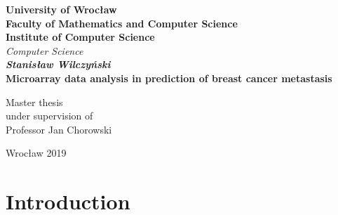 \documentclass[12pt, wide]{mwart}
\newcommand\blankpage{%
    \null
    \thispagestyle{empty}%
    \newpage}
\begin{document}
\newpage
\thispagestyle{empty}
\begin{center}
\textbf{\large University of Wrocław \\Faculty of Mathematics and Computer Science\\ Institute of Computer Science}\\
\textit{\large  Computer Science}\\
\vspace{4cm}
\textbf{\textit{\large Stanisław Wilczyński}\\
\vspace{0.5cm}
{\Large Microarray data analysis in prediction of breast cancer metastasis}}\\
\end{center}
\vspace{3cm}
\begin{center}

\large {Master thesis\\
under supervision of\\
Professor Jan Chorowski\\}

\end{center}

\vfill
\begin{center}
\large Wrocław 2019\\
\end{center}

\afterpage{\blankpage}
\newpage
\tableofcontents    
\section{Introduction}
\end{document}
